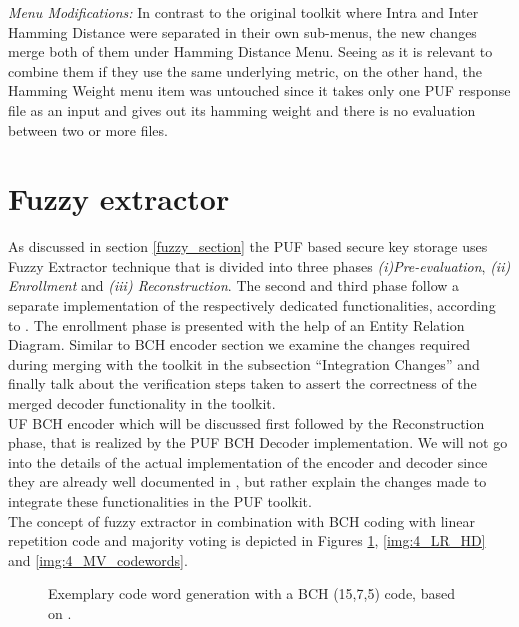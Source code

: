 \emph{Menu Modifications:} In contrast to the original toolkit where Intra and Inter Hamming Distance were separated in their own sub-menus, the new changes merge both of them under Hamming Distance Menu. Seeing as it is relevant to combine them if they use the same underlying metric, on the other hand, the Hamming Weight menu item was untouched since it takes only one PUF response file as an input and gives out its hamming weight and there is no evaluation between two or
more files.\\


\section{Fuzzy extractor}
As discussed in section \ref{fuzzy_section} the PUF based secure key storage uses Fuzzy Extractor technique that is divided into three phases \emph{(i)Pre-evaluation}, \emph{(ii) Enrollment} and \emph{(iii) Reconstruction}. The second and third phase follow a separate implementation of the respectively dedicated functionalities, according to \cite{10}. The enrollment phase is presented with the help of an Entity Relation Diagram. Similar to BCH encoder
section we examine the changes required during merging with the toolkit in the subsection ``Integration Changes'' and finally talk about the verification steps taken to assert the correctness of the merged decoder functionality in the toolkit.\\UF BCH encoder which will be discussed first followed by the Reconstruction phase, that is
realized by the PUF BCH Decoder implementation. We will not go into the details of the actual implementation of the encoder and decoder since they are already well documented in \cite{71}, but rather explain the changes made to integrate these functionalities in the PUF toolkit.\\

The concept of fuzzy extractor in combination with BCH coding with linear repetition code and majority voting is depicted in Figures \ref{img:4_BCH_concept}, \ref{img:4_LR_HD} and \ref{img:4_MV_codewords}.

\begin{figure}[h]
\centering
{}
\caption{Exemplary code word generation with a BCH (15,7,5) code, based on \cite{10}.}
\label{img:4_BCH_concept}
\end{figure}

